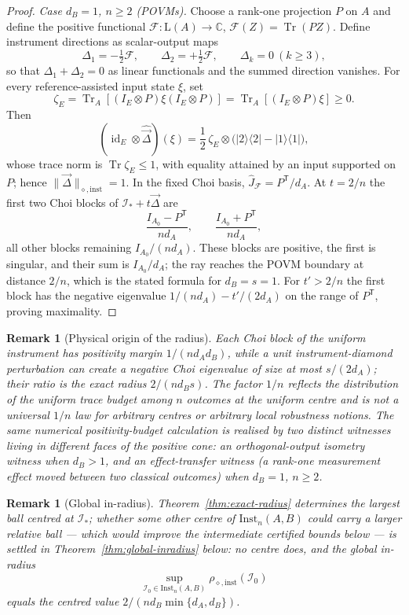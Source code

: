 \documentclass[11pt,a4paper]{article}
\newtheorem{remark}[theorem]{Remark}
\newcommand{\Lin}{\mathrm{L}}
\newcommand{\Inst}{\mathrm{Inst}}
\newcommand{\Tr}{\operatorname{Tr}}
\newcommand{\id}{\operatorname{id}}
\newcommand{\Jhat}{\widehat J}
\newcommand{\vD}{\vec{\Delta}}
\begin{document}
\begin{proof}
\emph{Case $d_B=1$, $n\ge2$ (POVMs).} Choose a rank-one projection $P$ on $A$ and define the positive functional $\mathcal F:\Lin(A)\to\mathbb C$, $\mathcal F(Z)=\Tr(PZ)$. Define instrument directions as scalar-output maps
\[
\Delta_1=-\tfrac12\mathcal F,\qquad \Delta_2=+\tfrac12\mathcal F,\qquad \Delta_k=0\ (k\ge3),
\]
so that $\Delta_1+\Delta_2=0$ as linear functionals and the summed direction vanishes. For every reference-assisted input state $\xi$, set
\[
\zeta_E=\Tr_A[(I_E\otimes P)\xi(I_E\otimes P)]=\Tr_A[(I_E\otimes P)\xi]\ge0.
\]
Then
\[
(\id_E\otimes\widehat{\vD})(\xi)
=\frac12\,\zeta_E\otimes\big(|2\rangle\langle2|-|1\rangle\langle1|\big),
\]
whose trace norm is $\Tr\zeta_E\le1$, with equality attained by an input supported on $P$; hence $\|\vD\|_{\diamond,\mathrm{inst}}=1$. In the fixed Choi basis, $\Jhat_{\mathcal F}=P^{\mathsf T}/d_A$. At $t=2/n$ the first two Choi blocks of $\mathcal I_*+t\vD$ are
\[
\frac{I_{A_0}-P^{\mathsf T}}{nd_A},\qquad
\frac{I_{A_0}+P^{\mathsf T}}{nd_A},
\]
all other blocks remaining $I_{A_0}/(nd_A)$. These blocks are positive, the first is singular, and their sum is $I_{A_0}/d_A$; the ray reaches the POVM boundary at distance $2/n$, which is the stated formula for $d_B=s=1$. For $t'>2/n$ the first block has the negative eigenvalue $1/(nd_A)-t'/(2d_A)$ on the range of $P^{\mathsf T}$, proving maximality.
\end{proof}

\begin{remark}[Physical origin of the radius]
\label{rem:physical-origin}
Each Choi block of the uniform instrument has positivity margin $1/(nd_Ad_B)$, while a unit instrument-diamond perturbation can create a negative Choi eigenvalue of size at most $s/(2d_A)$; their ratio is the exact radius $2/(nd_Bs)$. The factor $1/n$ reflects the distribution of the uniform trace budget among $n$ outcomes \emph{at the uniform centre} and is not a universal $1/n$ law for arbitrary centres or arbitrary local robustness notions. The same numerical positivity-budget calculation is realised by two \emph{distinct} witnesses living in different faces of the positive cone: an orthogonal-output isometry witness when $d_B>1$, and an effect-transfer witness (a rank-one measurement effect moved between two classical outcomes) when $d_B=1$, $n\ge2$.
\end{remark}

\begin{remark}[Global in-radius]
\label{rem:global-inradius}
Theorem~\ref{thm:exact-radius} determines the largest ball centred at $\mathcal I_*$; whether some other centre of $\Inst_n(A,B)$ could carry a larger relative ball --- which would improve the intermediate certified bounds below --- is settled in Theorem~\ref{thm:global-inradius} below: no centre does, and the global in-radius
\[
\sup_{\mathcal I_0\in\Inst_n(A,B)}\rho_{\diamond,\mathrm{inst}}(\mathcal I_0)
\]
equals the centred value $2/(nd_B\min\{d_A,d_B\})$.
\end{remark}
\end{document}
